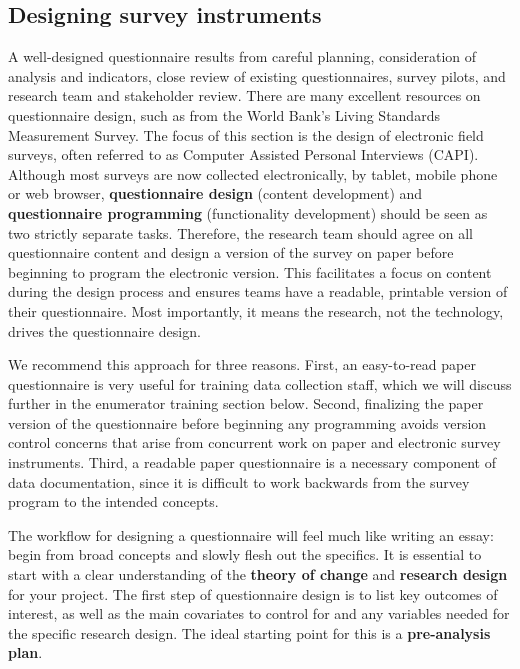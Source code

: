 \subsection{Designing survey instruments}
A well-designed questionnaire results from careful planning,
consideration of analysis and indicators,
close review of existing questionnaires,
survey pilots, and research team and stakeholder review.
There are many excellent resources on questionnaire design,
such as from the World Bank's Living Standards Measurement Survey.
The focus of this section is the design of electronic field surveys,
often referred to as Computer Assisted Personal Interviews (CAPI).
Although most surveys are now collected electronically, by tablet, mobile phone or web browser,
\textbf{questionnaire design}
(content development) and \textbf{questionnaire programming}
(functionality development) should be seen as two strictly separate tasks.
Therefore, the research team should agree on all questionnaire content
and design a version of the survey on paper
before beginning to program the electronic version.
This facilitates a focus on content during the design process
and ensures teams have a readable, printable version of their questionnaire.
Most importantly, it means the research, not the technology,
drives the questionnaire design.

We recommend this approach for three reasons.
First, an easy-to-read paper questionnaire
is very useful for training data collection staff, 
which we will discuss further in the enumerator training section below.
Second, finalizing the paper version of the questionnaire before beginning any programming
avoids version control concerns that arise from concurrent work
on paper and electronic survey instruments.
Third, a readable paper questionnaire is a necessary component of data documentation,
since it is difficult to work backwards from the survey program to the intended concepts.

The workflow for designing a questionnaire will feel much like writing an essay:
begin from broad concepts and slowly flesh out the specifics.
It is essential to start with a clear understanding of the
\textbf{theory of change}
and \textbf{research design}
  for your project.
The first step of questionnaire design is to list key outcomes of interest,
as well as the main covariates to control for and any variables needed for the specific research design.
The ideal starting point for this is a \textbf{pre-analysis plan}.

